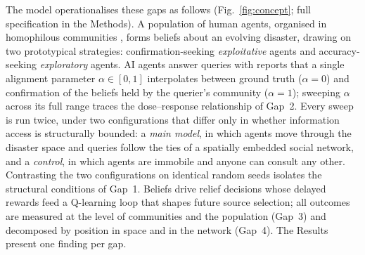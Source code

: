 \documentclass[pdflatex,sn-nature]{sn-jnl}
\begin{document}
The model operationalises these gaps as follows (Fig.~\ref{fig:concept}; full specification in the Methods). A population of human agents, organised in homophilous communities \citep{mcpherson2001birds}, forms beliefs about an evolving disaster, drawing on two prototypical strategies: confirmation-seeking \emph{exploitative} agents and accuracy-seeking \emph{exploratory} agents. AI agents answer queries with reports that a single alignment parameter $\alpha \in [0,1]$ interpolates between ground truth ($\alpha = 0$) and confirmation of the beliefs held by the querier's community ($\alpha = 1$); sweeping $\alpha$ across its full range traces the dose--response relationship of Gap~2. Every sweep is run twice, under two configurations that differ only in whether information access is structurally bounded: a \emph{main model}, in which agents move through the disaster space and queries follow the ties of a spatially embedded social network, and a \emph{control}, in which agents are immobile and anyone can consult any other. Contrasting the two configurations on identical random seeds isolates the structural conditions of Gap~1. Beliefs drive relief decisions whose delayed rewards feed a Q-learning loop that shapes future source selection; all outcomes are measured at the level of communities and the population (Gap~3) and decomposed by position in space and in the network (Gap~4). The Results present one finding per gap.
\end{document}
